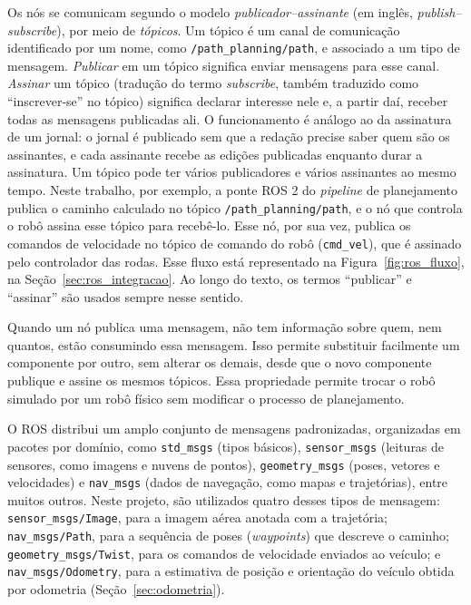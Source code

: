 \documentclass[
    12pt,
    openright,
    oneside,
    a4paper,
    english,
    brazil
]{abntex2}
\begin{document}
Os nós se comunicam segundo o modelo \emph{publicador--assinante} (em inglês, \textit{publish--subscribe}), por meio de \emph{tópicos}. Um tópico é um canal de comunicação identificado por um nome, como \texttt{/\allowbreak{}path\_\allowbreak{}planning/\allowbreak{}path}, e associado a um tipo de mensagem. \emph{Publicar} em um tópico significa enviar mensagens para esse canal. \emph{Assinar} um tópico (tradução do termo \textit{subscribe}, também traduzido como ``inscrever-se'' no tópico) significa declarar interesse nele e, a partir daí, receber todas as mensagens publicadas ali. O funcionamento é análogo ao da assinatura de um jornal: o jornal é publicado sem que a redação precise saber quem são os assinantes, e cada assinante recebe as edições publicadas enquanto durar a assinatura. Um tópico pode ter vários publicadores e vários assinantes ao mesmo tempo. Neste trabalho, por exemplo, a ponte ROS 2 do \textit{pipeline} de planejamento publica o caminho calculado no tópico \texttt{/\allowbreak{}path\_\allowbreak{}planning/\allowbreak{}path}, e o nó que controla o robô assina esse tópico para recebê-lo. Esse nó, por sua vez, publica os comandos de velocidade no tópico de comando do robô (\texttt{cmd\_\allowbreak{}vel}), que é assinado pelo controlador das rodas. Esse fluxo está representado na Figura~\ref{fig:ros_fluxo}, na Seção~\ref{sec:ros_integracao}. Ao longo do texto, os termos ``publicar'' e ``assinar'' são usados sempre nesse sentido.

Quando um nó publica uma mensagem, não tem informação sobre quem, nem quantos, estão consumindo essa mensagem. Isso permite substituir facilmente um componente por outro, sem alterar os demais, desde que o novo componente publique e assine os mesmos tópicos. Essa propriedade permite trocar o robô simulado por um robô físico sem modificar o processo de planejamento.

O ROS distribui um amplo conjunto de mensagens padronizadas, organizadas em pacotes por domínio, como \texttt{std\_\allowbreak{}msgs} (tipos básicos), \texttt{sensor\_\allowbreak{}msgs} (leituras de sensores, como imagens e nuvens de pontos), \texttt{geometry\_\allowbreak{}msgs} (poses, vetores e velocidades) e \texttt{nav\_\allowbreak{}msgs} (dados de navegação, como mapas e trajetórias), entre muitos outros. Neste projeto, são utilizados quatro desses tipos de mensagem: \texttt{sensor\_\allowbreak{}msgs/\allowbreak{}Image}, para a imagem aérea anotada com a trajetória; \texttt{nav\_\allowbreak{}msgs/\allowbreak{}Path}, para a sequência de poses (\textit{waypoints}) que descreve o caminho; \texttt{geometry\_\allowbreak{}msgs/\allowbreak{}Twist}, para os comandos de velocidade enviados ao veículo; e \texttt{nav\_\allowbreak{}msgs/\allowbreak{}Odometry}, para a estimativa de posição e orientação do veículo obtida por odometria (Seção~\ref{sec:odometria}).
\end{document}
